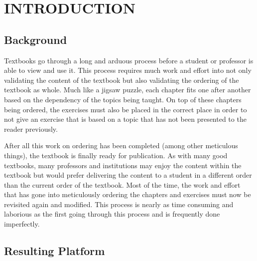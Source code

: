 %
%
%
%


\pagestyle{plain} %

\chapter{INTRODUCTION}

\section{Background}

Textbooks go through a long and arduous process before a student or professor is able to view and use it. This process requires much work and effort into not only validating the content of the textbook but also validating the ordering of the textbook as whole. Much like a jigsaw puzzle, each chapter fits one after another based on the dependency of the topics being taught. On top of these chapters being ordered, the exercises must also be placed in the correct place in order to not give an exercise that is based on a topic that has not been presented to the reader previously.

After all this work on ordering has been completed (among other meticulous things), the textbook is finally ready for publication. As with many good textbooks, many professors and institutions may enjoy the content within the textbook but would prefer delivering the content to a student in a different order than the current order of the textbook. Most of the time, the work and effort that has gone into meticulously ordering the chapters and exercises must now be revisited again and modified. This process is nearly as time consuming and laborious as the first going through this process and is frequently done imperfectly.

\section{Resulting Platform}


